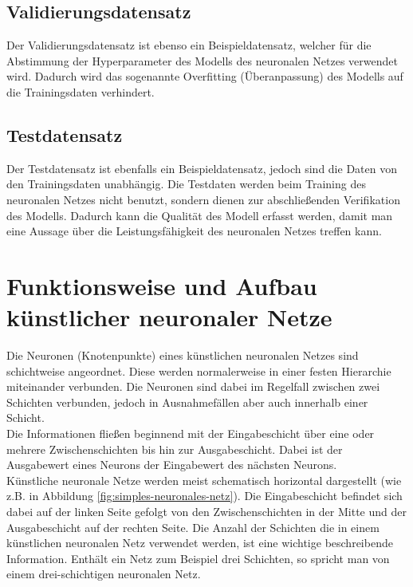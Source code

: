\subsection{Validierungsdatensatz}

Der Validierungsdatensatz ist ebenso ein Beispieldatensatz, welcher für die Abstimmung der Hyperparameter des Modells des neuronalen Netzes verwendet wird. Dadurch wird das sogenannte \glqq Overfitting\grqq{} (Überanpassung) des Modells auf die Trainingsdaten verhindert. \cite{datasolut} \\

\subsection{Testdatensatz}

Der Testdatensatz ist ebenfalls ein Beispieldatensatz, jedoch sind die Daten von den Trainingsdaten unabhängig. Die Testdaten werden beim Training des neuronalen Netzes nicht benutzt, sondern dienen zur abschließenden Verifikation des Modells. Dadurch kann die Qualität des Modell erfasst werden, damit man eine Aussage über die Leistungsfähigkeit des neuronalen Netzes treffen kann. \cite{datasolut} \\

\section{Funktionsweise und Aufbau künstlicher neuronaler Netze}

Die Neuronen (Knotenpunkte) eines künstlichen neuronalen Netzes sind schichtweise angeordnet. Diese werden normalerweise in einer festen Hierarchie miteinander verbunden. Die Neuronen sind dabei im Regelfall zwischen zwei Schichten verbunden, jedoch in Ausnahmefällen aber auch innerhalb einer Schicht. \cite{jaai} \\

Die Informationen fließen beginnend mit der Eingabeschicht über eine oder mehrere Zwischenschichten bis hin zur Ausgabeschicht. Dabei ist der Ausgabewert eines Neurons der Eingabewert des nächsten Neurons. \cite{jaai} \\

Künstliche neuronale Netze werden meist schematisch horizontal dargestellt (wie z.B. in Abbildung \ref{fig:simples-neuronales-netz}). Die Eingabeschicht befindet sich dabei auf der linken Seite  gefolgt von den Zwischenschichten in der Mitte und der Ausgabeschicht auf der rechten Seite.
Die Anzahl der Schichten die in einem künstlichen neuronalen Netz verwendet werden, ist eine wichtige beschreibende Information. Enthält ein Netz zum Beispiel drei Schichten, so spricht man von einem drei-schichtigen neuronalen Netz. \cite{jaai}

